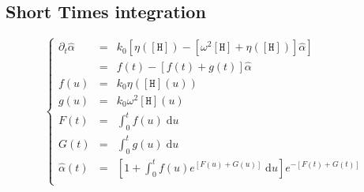 \documentclass[aps,onecolumn,11pt]{revtex4}
\newcommand{\mychem}[1]{\mathtt{#1}}
\newcommand{\myconc}[1]{\left\lbrack{#1}\right\rbrack}
\newcommand{\spproton}{\mychem{H}}
\newcommand{\proton}{\myconc{\spproton}}
\begin{document}
\subsection{Short Times integration}
\begin{equation}
\left\lbrace
\begin{array}{rcl}
	\partial_t \hat\alpha & = & k_0 \left[ \eta(\proton) - \left[ \omega^2 \proton + \eta(\proton) \right] \hat\alpha \right]\\
	 & = & f(t) - \left[ f(t) + g(t) \right] \hat\alpha\\
	 f(u) & = & k_0 \eta\left( \proton(u) \right) \\
	 g(u) & = & k_0 \omega^2 \proton(u)\\
	 F(t) & = & \int_0^t f(u) \; \mathrm{d}u \\
	 G(t) & = & \int_0^t g(u) \; \mathrm{d}u \\
	 \hat\alpha(t) & = & \left[ 1 + \int_0^t f(u) e^{\left[F(u)+G(u)\right]}\;\mathrm{d}u\right] e^{-\left[F(t)+G(t)\right]}\\
\end{array}
\right.
\end{equation}
\end{document}

